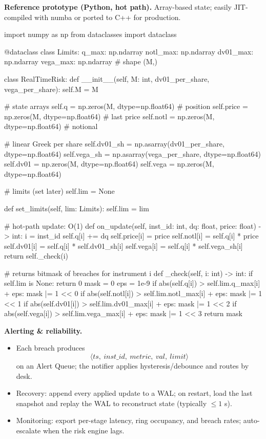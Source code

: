 \documentclass[11pt,letterpaper,openany]{book}
\begin{document}
\textbf{Reference prototype (Python, hot path).} Array-based state; easily JIT-compiled with numba or ported to C++ for production.
\begin{codeblock}
import numpy as np
from dataclasses import dataclass

@dataclass
class Limits:
    q_max: np.ndarray
    notl_max: np.ndarray
    dv01_max: np.ndarray
    vega_max: np.ndarray
    # shape (M,)

class RealTimeRisk:
    def __init__(self, M: int, dv01_per_share, vega_per_share):
        self.M = M

        # state arrays
        self.q = np.zeros(M, dtype=np.float64)       # position
        self.price = np.zeros(M, dtype=np.float64)   # last price
        self.notl = np.zeros(M, dtype=np.float64)    # notional

        # linear Greek per share
        self.dv01_sh = np.asarray(dv01_per_share, dtype=np.float64)
        self.vega_sh = np.asarray(vega_per_share, dtype=np.float64)
        self.dv01 = np.zeros(M, dtype=np.float64)
        self.vega = np.zeros(M, dtype=np.float64)

        # limits (set later)
        self.lim = None

    def set_limits(self, lim: Limits):
        self.lim = lim

    # hot-path update: O(1)
    def on_update(self, inst_id: int, dq: float, price: float) -> int:
        i = inst_id
        self.q[i] += dq
        self.price[i] = price
        self.notl[i] = self.q[i] * price
        self.dv01[i] = self.q[i] * self.dv01_sh[i]
        self.vega[i] = self.q[i] * self.vega_sh[i]
        return self._check(i)

    # returns bitmask of breaches for instrument i
    def _check(self, i: int) -> int:
        if self.lim is None:
            return 0
        mask = 0
        eps = 1e-9
        if abs(self.q[i]) > self.lim.q_max[i] + eps:
            mask |= 1 << 0
        if abs(self.notl[i]) > self.lim.notl_max[i] + eps:
            mask |= 1 << 1
        if abs(self.dv01[i]) > self.lim.dv01_max[i] + eps:
            mask |= 1 << 2
        if abs(self.vega[i]) > self.lim.vega_max[i] + eps:
            mask |= 1 << 3
        return mask
\end{codeblock}

\textbf{Alerting \& reliability.}
\begin{itemize}
\item Each breach produces
\[
\langle ts,\ inst\_id,\ metric,\ val,\ limit\rangle
\]
on an Alert Queue; the notifier applies hysteresis/debounce and routes by desk.
\item Recovery: append every applied update to a WAL; on restart, load the last snapshot and replay the WAL to reconstruct state (typically \(\le 1\) s).
\item Monitoring: export per-stage latency, ring occupancy, and breach rates; auto-escalate when the risk engine lags.
\end{itemize}
\end{document}
